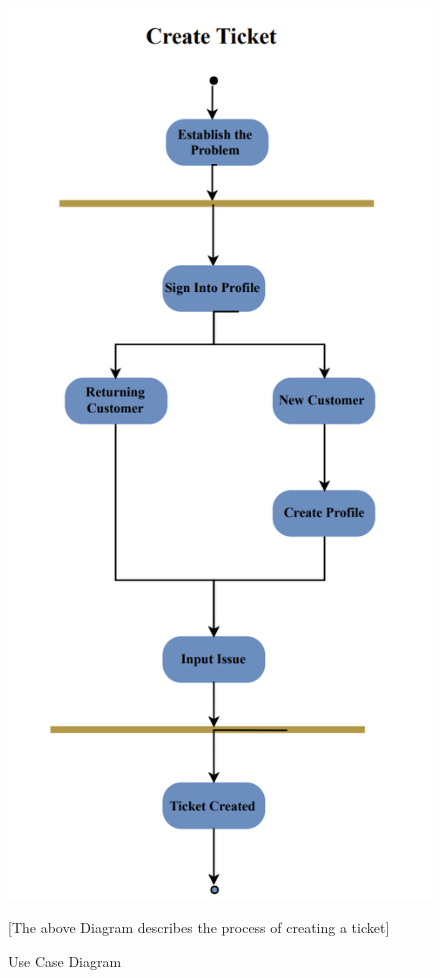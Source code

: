 \documentclass[letterpaper]{article}
\begin{document}
\begin{figure}[htbp]
  \includegraphics[]{AD_CreateTicket}
  \caption{Use Case Diagram}[The above Diagram describes the process of creating a ticket]
  \centering
\end{figure}
\end{document}
